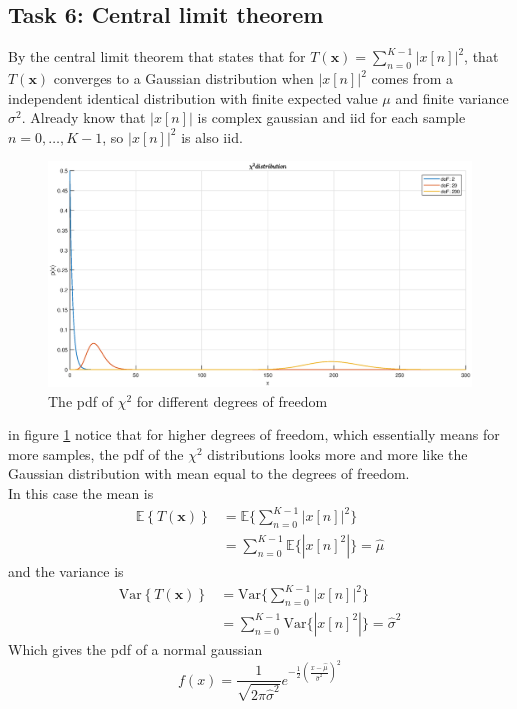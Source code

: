 \subsection{Task 6: Central limit theorem}
By the central limit theorem that states that for $T(\mathbf{x}) = \sum_{n=0}^{K-1}|x[n]|^2$, that $T(\mathbf{x})$ converges to a Gaussian distribution when $|x[n]|^2$ comes from a independent identical distribution with finite expected value $\mu$ and finite variance $\sigma^2$. Already know that $|x[n]|$ is complex gaussian and iid for each sample $n = 0, \dots, K-1$, so $|x[n]|^2$ is also iid.\\
\begin{figure}
    \centering
    \includegraphics[width=\textwidth]{figures/chi_square.eps}
    \caption{The pdf of $\chi^2$ for different degrees of freedom}
    \label{fig:chitogauss}
\end{figure}
in figure \ref{fig:chitogauss} notice that for higher degrees of freedom, which essentially means for more samples, the pdf of the $\chi^2$ distributions looks more and more like the Gaussian distribution with mean equal to the degrees of freedom.\\
In this case the mean is
\begin{align}
    \mathbb{E}\left\{T(\mathbf{x})\right\} & = \mathbb{E}\{\sum_{n=0}^{K-1}|x[n]|^2\}\nonumber\\
    & = \sum_{n=0}^{K-1}\mathbb{E}\{|x[n]^2|\} = \hat{\mu}
\end{align}
and the variance is
\begin{align}
    \mathrm{Var}\left\{T(\mathbf{x})\right\} & = \mathrm{Var}\{\sum_{n=0}^{K-1}|x[n]|^2\}\nonumber\\
    & = \sum_{n=0}^{K-1}\mathrm{Var}\{|x[n]^2|\} = \hat{\sigma}^2
\end{align}
Which gives the pdf of a normal gaussian
\begin{equation}
    f(x) = \frac{1}{\sqrt{2\pi\hat{\sigma}^2}}e^{-\frac{1}{2}\left(\frac{x-\hat{\mu}}{\hat{\sigma}^2}\right)^2}
\end{equation}







